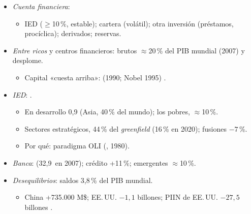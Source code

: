 \documentclass{article}
\begin{document}
\begin{columnas}
\begin{itemize}
\item \emph{Cuenta financiera}:
  \begin{itemize}
  \item IED ($\geq$10\,\%, estable); cartera (volátil); otra inversión (préstamos, procíclica); derivados; reservas.
  \end{itemize}
\item \emph{Entre ricos} y centros financieros: brutos $\approx$20\,\% del PIB mundial (2007) y desplome.
  \begin{itemize}
  \item Capital «cuesta arriba»:  (1990; Nobel 1995) .
  \end{itemize}
\item \emph{IED}: .
  \begin{itemize}
  \item En desarrollo 0,9 (Asia, 40\,\% del mundo); los pobres, $\approx$10\,\%.
  \item Sectores estratégicos, 44\,\% del \emph{greenfield} (16\,\% en 2020); fusiones $-7$\,\%.
  \item Por qué: paradigma OLI (, 1980).
  \end{itemize}
\end{itemize}
\begin{itemize}
\item \emph{Banca}:  (32,9~en 2007); crédito +11\,\%; emergentes $\approx$10\,\%.
\item \emph{Desequilibrios}: saldos 3,8\,\% del PIB mundial.
  \begin{itemize}
  \item China +735.000 M\$; EE.\,UU. $-1{,}1$ billones; PIIN de EE.\,UU. $-27{,}5$ billones .
  \end{itemize}
\end{itemize}


\end{columnas}
\end{document}
